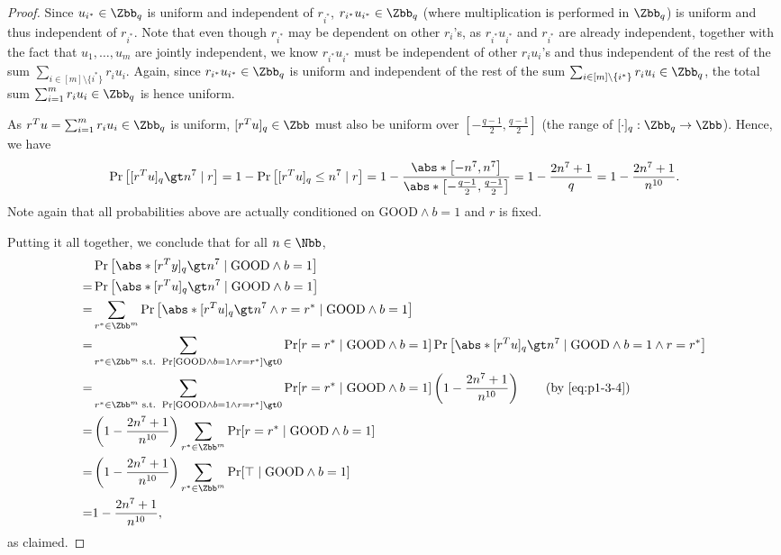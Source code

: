 \begin{answer}[iii]
\begin{proof}
        Since $u_{i^\ast}\in \Zbb_q$ is uniform and independent of $r_{i^\ast}$, $r_{i^\ast}u_{i^\ast}\in \Zbb_q$ (where multiplication is performed in $\Zbb_q$) is uniform and thus independent of $r_{i^\ast}$. Note that even though $r_{i^\ast}$ may be dependent on other $r_i$'s, as $r_{i^\ast}u_{i^\ast}$ and $r_{i^\ast}$ are already independent, together with the fact that $u_1,\ldots, u_m$ are jointly independent, we know $r_{i^\ast}u_{i^\ast}$ must be independent of other $r_iu_i$'s and thus independent of the rest of the sum $\sum_{i\in [m]\setminus \{i^\ast\}} r_iu_i$. Again, since $r_{i^\ast}u_{i^\ast}\in \Zbb_q$ is uniform and independent of the rest of the sum $\sum_{i\in [m]\setminus \{i^\ast\}} r_iu_i \in \Zbb_q$, the total sum $\sum_{i=1}^m r_iu_i\in \Zbb_q$ is hence uniform.

        As $r^Tu=\sum_{i=1}^m r_iu_i\in \Zbb_q$ is uniform, $[r^Tu]_q\in \Zbb$ must also be uniform over $\left[-\frac{q-1}{2}, \frac{q-1}{2}\right]$ (the range of $[\cdot]_q:\Zbb_q\to \Zbb$). Hence, we have
        \begin{equation}\label{eq:p1-3-4}
            \Pr\left[[r^Tu]_q \gt n^7\mid r\right]
            = 1- \Pr\left[[r^Tu]_q \le n^7\mid r\right]
            = 1- \frac{\abs*{\left[-n^7, n^7\right]}}{\abs*{\left[-\frac{q-1}{2}, \frac{q-1}{2}\right]}}
            = 1-\frac{2n^7+1}{q}
            =1-\frac{2n^7+1}{n^{10}}.
        \end{equation}
        Note again that all probabilities above are actually conditioned on $\textrm{GOOD} \land b=1$ and $r$ is fixed.

        Putting it all together, we conclude that for all $n\in \Nbb$,
        \begin{align*}
            &\Pr\left[\abs*{[r^Ty]_q} \gt n^7 \mid \textrm{GOOD} \land b=1\right]\\
            =& \Pr\left[\abs*{[r^Tu]_q} \gt n^7 \mid \textrm{GOOD} \land b=1\right]\\
            =& \sum_{r^\ast\in \Zbb^m}\Pr\left[\abs*{[r^Tu]_q} \gt n^7 \land r=r^\ast\mid \textrm{GOOD} \land b=1\right]\\
            =& \sum_{r^\ast\in \Zbb^m \textrm{ s.t. } \Pr[\textrm{GOOD} \land b=1 \land r=r^\ast]\gt 0} \Pr[r=r^\ast\mid \textrm{GOOD} \land b=1] \Pr\left[\abs*{[r^Tu]_q} \gt n^7 \mid \textrm{GOOD} \land b=1 \land r=r^\ast\right]\\
            =& \sum_{r^\ast\in \Zbb^m \textrm{ s.t. } \Pr[\textrm{GOOD} \land b=1 \land r=r^\ast]\gt 0} \Pr[r=r^\ast\mid \textrm{GOOD} \land b=1] \left(1-\frac{2n^7+1}{n^{10}}\right)
            \qquad (\textrm{by \eqref{eq:p1-3-4}})\\
            =& \left(1-\frac{2n^7+1}{n^{10}}\right) \sum_{r^\ast\in \Zbb^m} \Pr[r=r^\ast\mid \textrm{GOOD} \land b=1]\\
            =& \left(1-\frac{2n^7+1}{n^{10}}\right) \sum_{r^\ast\in \Zbb^m} \Pr[\top \mid \textrm{GOOD} \land b=1]\\
            =& 1-\frac{2n^7+1}{n^{10}},
        \end{align*}
        as claimed.
    \end{proof}


\end{answer}
